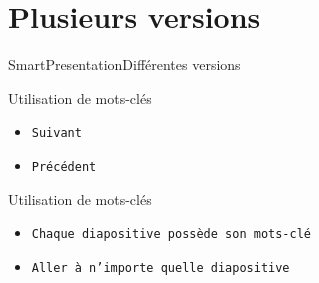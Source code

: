 \documentclass[10pt]{beamer}
\begin{document}
\section{Plusieurs versions}
\begin{frame}{SmartPresentation}{Différentes versions}
	\begin{block}{Utilisation de mots-clés}%
	  	\begin{itemize}
	  		\item {\tt Suivant}   		
    		\item {\tt Précédent}
		\end{itemize}
	\end{block}

	\begin{block}{Utilisation de mots-clés}%
	  	\begin{itemize}
	  		\item {\tt Chaque diapositive possède son mots-clé}   		
    		\item {\tt Aller à n'importe quelle diapositive}
		\end{itemize}
	\end{block}


\end{frame}
\end{document}
